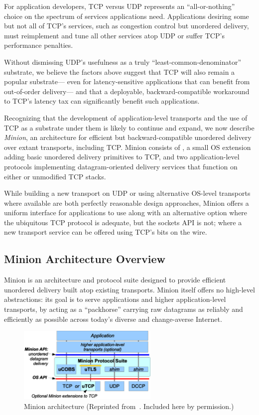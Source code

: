 For application developers,
TCP versus UDP represents an ``all-or-nothing'' choice
on the spectrum of services applications need.
Applications desiring some but not all of TCP's services,
such as congestion control but unordered delivery,
must reimplement and tune all other services atop UDP
or suffer TCP's performance penalties.

Without dismissing UDP's usefulness 
as a truly ``least-common-denominator'' substrate,
we believe the factors above
suggest that TCP will also remain a popular substrate---%
even for latency-sensitive applications
that can benefit from out-of-order delivery---%
and that a deployable, backward-compatible workaround
to TCP's latency tax
can significantly benefit such applications.

Recognizing that the development of application-level transports
and the use of TCP as a substrate under them
is likely to continue and expand,
we now describe {\em Minion},
an architecture for efficient but backward-compatible
unordered delivery over extant transports, including TCP.
Minion consists of
{\em \utcp},
a small OS extension
adding basic unordered delivery primitives to TCP,
and two application-level protocols
implementing datagram-oriented delivery services
that function on either \utcp or unmodified TCP stacks.

While building a new transport on UDP 
or using alternative OS-level transports where available
are both perfectly reasonable design approaches,
Minion offers a uniform interface for applications to use
along with an alternative option
where the ubiquitous TCP protocol is adequate, but the sockets API is not;
where a new transport service
can be offered using TCP's bits on the wire.

\subsection{Minion Architecture Overview}

Minion is an architecture and protocol suite
designed to provide efficient unordered delivery built atop
existing transports.
Minion itself offers no high-level abstractions:
its goal is to serve
applications and higher application-level transports,
by acting as a ``packhorse''
carrying raw datagrams as reliably and efficiently as possible
across today's diverse and change-averse Internet.

\begin{figure}[tbp]
\centering
\includegraphics[width=0.6\textwidth]{figures/minionarch.eps}
\caption{Minion architecture (Reprinted
  from~\cite{nowlan12fitting}. Included here by permission.)}
\label{f:minionarch}
\end{figure}

